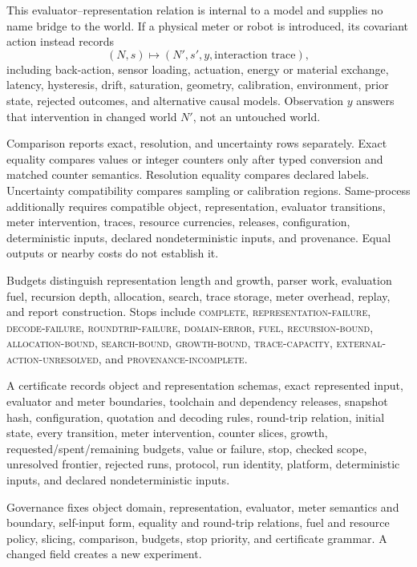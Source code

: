 This evaluator--representation relation is internal to a model and supplies no name bridge to the world.  If a
physical meter or robot is introduced, its covariant action instead records
\[
(N,s)\longmapsto(N',s',y,\text{interaction trace}),
\]
including back-action, sensor loading, actuation, energy or material exchange, latency, hysteresis, drift, saturation,
geometry, calibration, environment, prior state, rejected outcomes, and alternative causal models.  Observation
\(y\) answers that intervention in changed world \(N'\), not an untouched world.

Comparison reports exact, resolution, and uncertainty rows separately.  Exact equality compares values or integer
counters only after typed conversion and matched counter semantics.  Resolution equality compares declared labels.
Uncertainty compatibility compares sampling or calibration regions.  Same-process additionally requires compatible
object, representation, evaluator transitions, meter intervention, traces, resource currencies, releases,
configuration, deterministic inputs, declared nondeterministic inputs, and provenance.  Equal outputs or nearby costs
do not establish it.

Budgets distinguish representation length and growth, parser work, evaluation fuel, recursion depth, allocation,
search, trace storage, meter overhead, replay, and report construction.  Stops include \textsc{complete},
\textsc{representation-failure}, \textsc{decode-failure}, \textsc{roundtrip-failure}, \textsc{domain-error},
\textsc{fuel}, \textsc{recursion-bound}, \textsc{allocation-bound}, \textsc{search-bound},
\textsc{growth-bound}, \textsc{trace-capacity}, \textsc{external-action-unresolved}, and
\textsc{provenance-incomplete}.

A certificate records object and representation schemas, exact represented input, evaluator and meter boundaries,
toolchain and dependency releases, snapshot hash, configuration, quotation and decoding rules, round-trip relation,
initial state, every transition, meter intervention, counter slices, growth, requested/spent/remaining budgets, value
or failure, stop, checked scope, unresolved frontier, rejected runs, protocol, run identity, platform, deterministic
inputs, and declared nondeterministic inputs.

Governance fixes object domain, representation, evaluator, meter semantics and boundary, self-input form, equality and
round-trip relations, fuel and resource policy, slicing, comparison, budgets, stop priority, and certificate grammar.
A changed field creates a new experiment.

